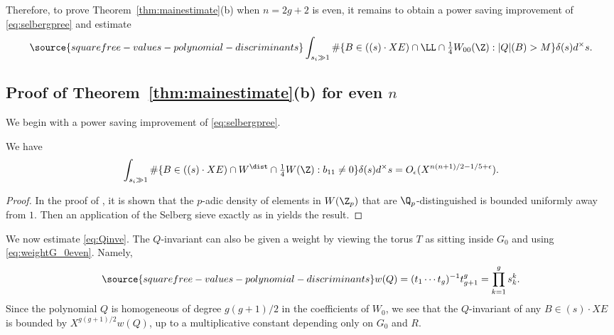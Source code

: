Therefore, to prove Theorem~\ref{thm:mainestimate}(b) when $n=2g+2$ is even, it remains to obtain a power saving improvement of \eqref{eq:selbergpree} and estimate
\begin{equation}\label{eq:Qinve}
\source{squarefree-values-polynomial-discriminants}
\int_{s_i\gg 1} \#\{B\in ((s)\cdot XE)\cap \LL\cap
{\textstyle\frac14} W_{00}(\Z):|Q|(B)>M\}\delta(s)d^\times s.
\end{equation}

\subsection{Proof of Theorem~\ref{thm:mainestimate}(b) for even $n$}\label{sgomeven}

We begin with a power saving improvement of \eqref{eq:selbergpree}.

\begin{proposition}
\notready\label{propeven}
  We have
  \begin{equation*}
\int_{s_i\gg 1} \#\{B\in ((s)\cdot XE)\cap W^\dist \cap {\textstyle\frac14} W(\Z): b_{11}\neq 0\}\delta(s)d^\times s =O_\epsilon(X^{n(n+1)/2-1/5+\epsilon}).
  \end{equation*}
\end{proposition}
\begin{proof}
In the proof of \cite[Proposition 23]{SW}, it is shown that the
$p$-adic density of elements in $W(\Z_p)$ that are
$\Q_p$-distinguished is bounded uniformly away from $1$.  Then an
application of the Selberg sieve exactly as in \cite{ShTs} yields the
result.
\end{proof}

We now estimate \eqref{eq:Qinve}. The $Q$-invariant can also be given
a weight by viewing the torus $T$ as sitting inside $G_0$ and using
\eqref{eq:weightG_0even}. Namely,
\begin{equation}\label{eqQweighteven}
\source{squarefree-values-polynomial-discriminants}
w(Q)=(t_1\cdots t_g)^{-1}t_{g+1}^g=\prod_{k=1}^g s_k^k.
\end{equation}
Since the polynomial $Q$ is homogeneous of degree $g(g+1)/2$ in the
coefficients of $W_0$, we see that the $Q$-invariant of any $B\in
(s)\cdot XE$ is bounded by $X^{g(g+1)/2}w(Q)$, up to a multiplicative
constant depending only on $G_0$ and $R$.


